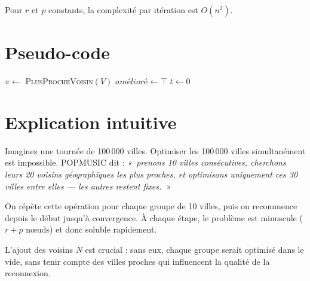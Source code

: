 \documentclass[11pt,a4paper]{article}
\begin{document}
Pour $r$ et $p$ constants, la complexité par itération est $O(n^2)$.

\section{Pseudo-code}

\begin{algorithm}[H]
\DontPrintSemicolon
\SetAlgoLined
{}

$\pi \leftarrow$ \textsc{PlusProcheVoisin}$(V)$\;
$\textit{amélioré} \leftarrow \top$\;
$t \leftarrow 0$\;

\;
\caption{POPMUSIC}
\end{algorithm}

\section{Explication intuitive}

\begin{tcolorbox}[intuition]
Imaginez une tournée de 100\,000 villes. Optimiser les 100\,000 villes
simultanément est impossible. POPMUSIC dit : \textit{«~prenons 10 villes
consécutives, cherchons leurs 20 voisins géographiques les plus proches, et
optimisons uniquement ces 30 villes entre elles --- les autres restent
fixes.~»}

On répète cette opération pour chaque groupe de 10 villes, puis on recommence
depuis le début jusqu'à convergence. À chaque étape, le problème est minuscule
($r + p$ nœuds) et donc soluble rapidement.

L'ajout des voisins $N$ est crucial : sans eux, chaque groupe serait optimisé
dans le vide, sans tenir compte des villes proches qui influencent la qualité
de la reconnexion.
\end{tcolorbox}
\end{document}
